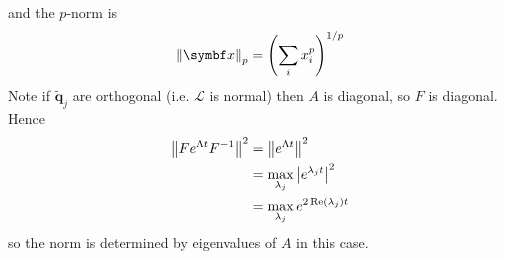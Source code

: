 \documentclass{jknotes}
\renewcommand{\L}{\mathcal{L}}
\begin{document}
and the $p$-norm is
\begin{equation}
	\norm{\x}_p = \left(\sum_i x_i^p\right)^{1/p}
\end{equation}
Note if $\symbf{\tilde{q}}_j$ are orthogonal (i.e. $\L$ is normal) then $A$ is
diagonal, so $F$ is diagonal. Hence
\begin{align}
	\norm{F e^{\Lambda t} F^{-1}}^2 &= \norm{e^{\Lambda t}}^2 \\
									&= \max_{\lambda_j} \abs{e^{\lambda_j
									t}}^2  \\
									&= \max_{\lambda_j} e^{2\Re(\lambda_j)t}
\end{align}
so the norm is determined by eigenvalues of $A$ in this case.
\end{document}
